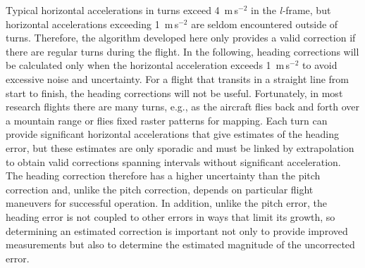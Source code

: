 \documentclass[12pt,twoside,english,12pt,twoside,english]{article}\usepackage[]{graphicx}\usepackage[]{color}
\let\OrgIndex\index
\renewcommand*{\index}[1]{\OrgIndex{#1}}
\begin{document}
Typical horizontal accelerations in turns exceed 4~m\,s$^{-2}$
in the \emph{l-}frame,
but horizontal accelerations exceeding 1~m\,s$^{-2}$ are seldom
encountered outside of turns. Therefore, the algorithm
developed here only provides a valid correction if there are regular
turns during the flight. In the following, heading corrections will
be calculated only when the horizontal acceleration exceeds 1~m\,s$^{-2}$
to avoid excessive noise and uncertainty. For a flight that transits
in a straight line from start to finish, the heading corrections will
not be useful. Fortunately, in most research flights there are many
turns, e.g., as the aircraft flies back and forth over a mountain
range or flies fixed raster patterns for mapping. Each turn can provide
significant horizontal accelerations that give estimates of the heading
error, but these estimates are only sporadic
and must be linked by extrapolation to obtain valid corrections spanning
intervals without significant acceleration. The heading
correction therefore has a higher uncertainty
than the pitch correction and, unlike the pitch correction, depends
on particular flight maneuvers for successful
operation. In addition, unlike the pitch error, the heading error
is not coupled to other errors in ways that
limit its growth, so determining an estimated correction is important
not only to provide improved measurements but also to determine the
estimated magnitude of the uncorrected error.
\end{document}

